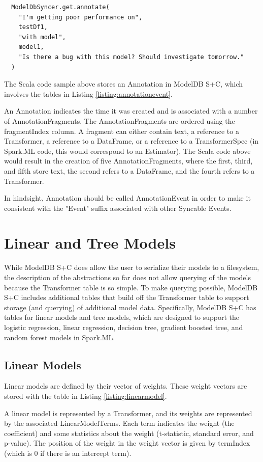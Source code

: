 \begin{verbatim}
  ModelDbSyncer.get.annotate(
    "I'm getting poor performance on", 
    testDf1, 
    "with model", 
    model1, 
    "Is there a bug with this model? Should investigate tomorrow."
  )
\end{verbatim}

The Scala code sample above stores an Annotation in ModelDB S+C, which involves
the tables in Listing \ref{listing:annotationevent}.

An Annotation indicates the time it was created and is associated with a number
of AnnotationFragments. The AnnotationFragments are ordered using the fragmentIndex
column. A fragment can either contain text, a reference to a Transformer, a reference
to a DataFrame, or a reference to a TransformerSpec (in Spark.ML code, this would
correspond to an Estimator), The Scala code above would result in the creation
of five AnnotationFragments, where the first, third, and fifth store text, the second
refers to a DataFrame, and the fourth refers to a Transformer.

In hindsight, Annotation should be called AnnotationEvent in order to make
it consistent with the "Event" suffix associated with other Syncable Events.

\section{Linear and Tree Models}

While ModelDB S+C does allow the user to serialize their models to a filesystem,
the description of the abstractions so far does not allow querying of the models
because the Transformer table is so simple. To make querying possible, ModelDB S+C
includes additional tables that build off the Transformer table to support storage
(and querying) of additional model data. Specifically, ModelDB S+C has tables for
linear models and tree models, which are designed to support the logistic regression,
linear regression, decision tree, gradient boosted tree, and random forest models in
Spark.ML.

\subsection{Linear Models}

Linear models are defined by their vector of weights. These weight vectors are
stored with the table in Listing \ref{listing:linearmodel}.

A linear model is represented by a Transformer, and its weights are represented
by the associated LinearModelTerms. Each term indicates the weight (the coefficient) and
some statistics about the weight (t-statistic, standard error, and p-value). The position
of the weight in the weight vector is given by termIndex (which is 0 if there is an intercept
term).

